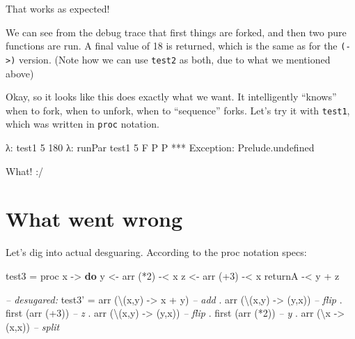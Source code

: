 \documentclass[]{article}
\newenvironment{Shaded}{}{}
\newcommand{\KeywordTok}[1]{\textcolor[rgb]{0.00,0.44,0.13}{\textbf{{#1}}}}
\newcommand{\DataTypeTok}[1]{\textcolor[rgb]{0.56,0.13,0.00}{{#1}}}
\newcommand{\DecValTok}[1]{\textcolor[rgb]{0.25,0.63,0.44}{{#1}}}
\newcommand{\CommentTok}[1]{\textcolor[rgb]{0.38,0.63,0.69}{\textit{{#1}}}}
\newcommand{\OtherTok}[1]{\textcolor[rgb]{0.00,0.44,0.13}{{#1}}}
\newcommand{\FunctionTok}[1]{\textcolor[rgb]{0.02,0.16,0.49}{{#1}}}
\newcommand{\NormalTok}[1]{{#1}}
\begin{document}
That works as expected!

We can see from the debug trace that first things are forked, and then
two pure functions are run. A final value of 18 is returned, which is
the same as for the \texttt{(-\textgreater{})} version. (Note how we can
use \texttt{test2} as both, due to what we mentioned above)

Okay, so it looks like this does exactly what we want. It intelligently
``knows'' when to fork, when to unfork, when to ``sequence'' forks.
Let's try it with \texttt{test1}, which was written in \texttt{proc}
notation.

\begin{Shaded}
\begin{Highlighting}[]
\NormalTok{λ}\FunctionTok{:} \NormalTok{test1 }\DecValTok{5}
\DecValTok{180}
\NormalTok{λ}\FunctionTok{:} \NormalTok{runPar test1 }\DecValTok{5}
\DataTypeTok{F}
\DataTypeTok{P}
\DataTypeTok{P}
\FunctionTok{***} \DataTypeTok{Exception}\FunctionTok{:} \NormalTok{Prelude.undefined}
\end{Highlighting}
\end{Shaded}

What! :/

\section{What went wrong}\label{what-went-wrong}

Let's dig into actual desguaring. According to the proc notation specs:

\begin{Shaded}
\begin{Highlighting}[]
\NormalTok{test3 }\FunctionTok{=} \NormalTok{proc x }\OtherTok{->} \KeywordTok{do}
    \NormalTok{y }\OtherTok{<-} \NormalTok{arr (}\FunctionTok{*}\DecValTok{2}\NormalTok{) }\FunctionTok{-<} \NormalTok{x}
    \NormalTok{z }\OtherTok{<-} \NormalTok{arr (}\FunctionTok{+}\DecValTok{3}\NormalTok{) }\FunctionTok{-<} \NormalTok{x}
    \NormalTok{returnA }\FunctionTok{-<} \NormalTok{y }\FunctionTok{+} \NormalTok{z}

\CommentTok{-- desugared:}
\NormalTok{test3' }\FunctionTok{=} \NormalTok{arr (\textbackslash{}(x,y) }\OtherTok{->} \NormalTok{x }\FunctionTok{+} \NormalTok{y)     }\CommentTok{-- add}
       \FunctionTok{.} \NormalTok{arr (\textbackslash{}(x,y) }\OtherTok{->} \NormalTok{(y,x))     }\CommentTok{-- flip}
       \FunctionTok{.} \NormalTok{first (arr (}\FunctionTok{+}\DecValTok{3}\NormalTok{))          }\CommentTok{-- z}
       \FunctionTok{.} \NormalTok{arr (\textbackslash{}(x,y) }\OtherTok{->} \NormalTok{(y,x))     }\CommentTok{-- flip}
       \FunctionTok{.} \NormalTok{first (arr (}\FunctionTok{*}\DecValTok{2}\NormalTok{))          }\CommentTok{-- y}
       \FunctionTok{.} \NormalTok{arr (\textbackslash{}x }\OtherTok{->} \NormalTok{(x,x))         }\CommentTok{-- split}
\end{Highlighting}
\end{Shaded}
\end{document}
